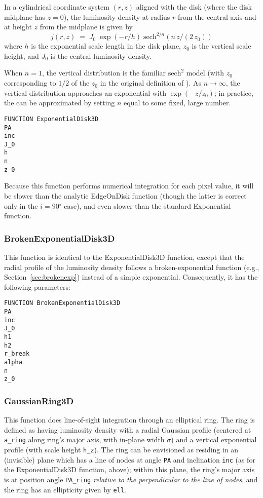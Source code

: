 \documentclass[10pt,a4paper,article]{memoir}
\newcommand{\arcdeg}{\ensuremath{^{\circ}}}
\begin{document}
In a cylindrical coordinate system $(r, z)$ aligned with the disk (where the disk
midplane has $z = 0$), the luminosity density at radius $r$ from 
the central axis and
at height $z$ from the midplane is given by
\begin{equation}
j(r,z) \; = \; J_{0} \; \exp(-r/h) \; {\mathrm{sech}}^{2/n} (n \, z/(2 \, z_{0}))
\end{equation}
where $h$ is the exponential scale length in the disk plane, $z_{0}$ is the vertical
scale height, and $J_{0}$ is the central luminosity density.

When $n = 1$, the vertical distribution is the familiar $\mathrm{sech}^2$ model
(with $z_{0}$ corresponding to $1/2$ of the $z_0$ in the original definition of
\citet{vdk81}). As $n \rightarrow \infty$, the vertical distribution approaches
an exponential with $\exp(-z/z_{0})$; in practice, the can be approximated by
setting $n$ equal to some fixed, large number.


\begin{verbatim}
FUNCTION ExponentialDisk3D
PA
inc
J_0
h
n
z_0
\end{verbatim}

Because this function performs numerical integration for each pixel value, it will be
slower than the analytic EdgeOnDisk function (though the latter is correct only in
the $i= 90\arcdeg$ case), and even slower than the standard Exponential function.



\subsubsection{BrokenExponentialDisk3D}

This function is identical to the ExponentialDisk3D function, except
that the radial profile of the luminosity density follows a
broken-exponential function (e.g., Section~\ref{sec:brokenexp}) instead
of a simple exponential. Consequently, it has the following parameters:

\begin{verbatim}
FUNCTION BrokenExponentialDisk3D
PA
inc
J_0
h1
h2
r_break
alpha
n
z_0
\end{verbatim}




\subsubsection{GaussianRing3D}

This function does line-of-sight integration through an elliptical ring.
The ring is defined as having luminosity density with a radial Gaussian
profile (centered at \texttt{a\_ring} along ring's major axis, with
in-plane width $\sigma$) and a vertical exponential profile (with scale
height \texttt{h\_z}). The ring can be envisioned as residing in an
(invisible) plane which has a line of nodes at angle \texttt{PA} and
inclination \texttt{inc} (as for the ExponentialDisk3D function, above);
within this plane, the ring's major axis is at position angle
\texttt{PA\_ring} \textit{relative to the perpendicular to the line of
nodes}, and the ring has an ellipticity given by \texttt{ell}.
\end{document}
